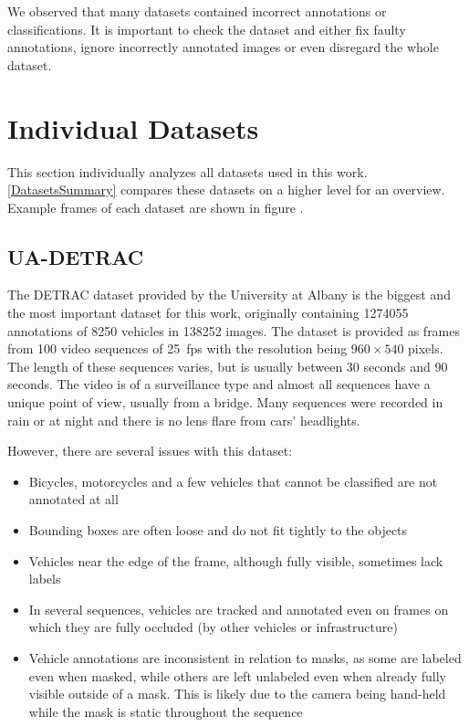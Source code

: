 We observed that many datasets contained incorrect annotations or
classifications. It is important to check the dataset and either fix faulty
annotations, ignore incorrectly annotated images or even disregard the whole
dataset.



\section{Individual Datasets}

This section individually analyzes all datasets used in this work.
\autoref{DatasetsSummary} compares these datasets on a higher level for an
overview. Example frames of each dataset are shown in figure   .


\subsection*{UA-DETRAC}
\label{DetracDataset}

The DETRAC dataset \cite{detrac} provided by the University at Albany is the
biggest and the most important dataset for this work, originally containing
\num{1274055} annotations of \num{8250} vehicles in \num{138252} images. The
dataset is provided as frames from 100 video sequences of \SI{25}{fps} with the
resolution being $960 \times 540$ pixels. The length of these sequences varies, but
is usually between 30 seconds and 90 seconds. The video is of a surveillance
type and almost all sequences have a unique point of view, usually from a
bridge. Many sequences were recorded in rain or at night and there is no lens
flare from cars' headlights.

However, there are several issues with this dataset:
\begin{itemize}
    \item Bicycles, motorcycles and a few vehicles that cannot be classified are
    not annotated at all
    \item Bounding boxes are often loose and do not fit tightly to the objects
    \item Vehicles near the edge of the frame, although fully visible,
    sometimes lack labels
    \item In several sequences, vehicles are tracked and annotated even on
    frames on which they are fully occluded (by other vehicles or infrastructure)
    \item Vehicle annotations are inconsistent in relation to masks, as some are
    labeled even when masked, while others are left unlabeled even when already
    fully visible outside of a mask. This is likely due to the camera being
    hand-held while the mask is static throughout the sequence
\end{itemize}

